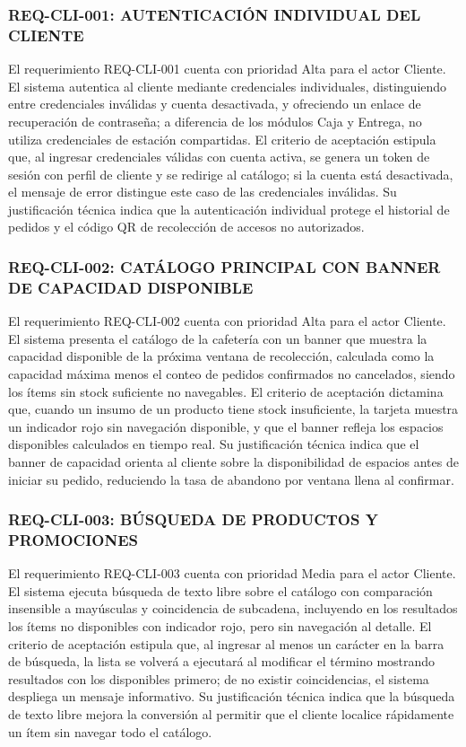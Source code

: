 \subsubsection{REQ-CLI-001: AUTENTICACIÓN INDIVIDUAL DEL CLIENTE}
El requerimiento REQ-CLI-001 cuenta con prioridad Alta para el actor Cliente. El sistema autentica al cliente mediante credenciales individuales, distinguiendo entre credenciales inválidas y cuenta desactivada, y ofreciendo un enlace de recuperación de contraseña; a diferencia de los módulos Caja y Entrega, no utiliza credenciales de estación compartidas. El criterio de aceptación estipula que, al ingresar credenciales válidas con cuenta activa, se genera un token de sesión con perfil de cliente y se redirige al catálogo; si la cuenta está desactivada, el mensaje de error distingue este caso de las credenciales inválidas. Su justificación técnica indica que la autenticación individual protege el historial de pedidos y el código QR de recolección de accesos no autorizados.

\subsubsection{REQ-CLI-002: CATÁLOGO PRINCIPAL CON BANNER DE CAPACIDAD DISPONIBLE}
El requerimiento REQ-CLI-002 cuenta con prioridad Alta para el actor Cliente. El sistema presenta el catálogo de la cafetería con un banner que muestra la capacidad disponible de la próxima ventana de recolección, calculada como la capacidad máxima menos el conteo de pedidos confirmados no cancelados, siendo los ítems sin stock suficiente no navegables. El criterio de aceptación dictamina que, cuando un insumo de un producto tiene stock insuficiente, la tarjeta muestra un indicador rojo sin navegación disponible, y que el banner refleja los espacios disponibles calculados en tiempo real. Su justificación técnica indica que el banner de capacidad orienta al cliente sobre la disponibilidad de espacios antes de iniciar su pedido, reduciendo la tasa de abandono por ventana llena al confirmar.

\subsubsection{REQ-CLI-003: BÚSQUEDA DE PRODUCTOS Y PROMOCIONES}
El requerimiento REQ-CLI-003 cuenta con prioridad Media para el actor Cliente. El sistema ejecuta búsqueda de texto libre sobre el catálogo con comparación insensible a mayúsculas y coincidencia de subcadena, incluyendo en los resultados los ítems no disponibles con indicador rojo, pero sin navegación al detalle. El criterio de aceptación estipula que, al ingresar al menos un carácter en la barra de búsqueda, la lista se volverá a ejecutará al modificar el término mostrando resultados con los disponibles primero; de no existir coincidencias, el sistema despliega un mensaje informativo. Su justificación técnica indica que la búsqueda de texto libre mejora la conversión al permitir que el cliente localice rápidamente un ítem sin navegar todo el catálogo.

